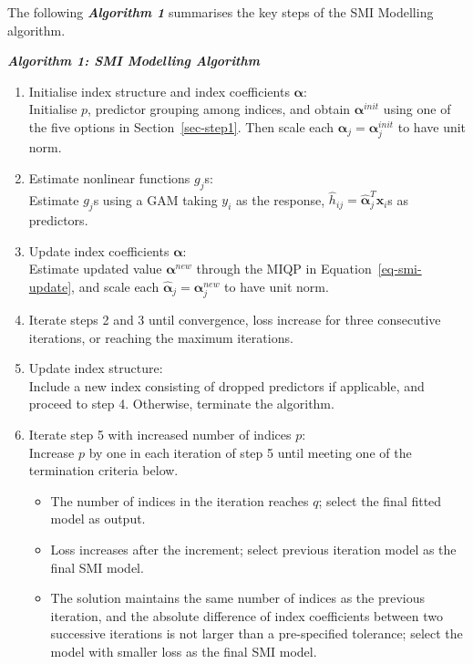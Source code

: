 \documentclass[11pt,a4paper,]{article}
\providecommand{\tightlist}{%
  \setlength{\itemsep}{0pt}\setlength{\parskip}{0pt}}
\begin{document}
The following \textbf{\emph{Algorithm 1}} summarises the key steps of
the SMI Modelling algorithm. \newline

\textbf{\emph{Algorithm 1: SMI Modelling Algorithm}}

\begin{enumerate}
\def\labelenumi{\arabic{enumi}.}
\item
  Initialise index structure and index coefficients \(\bm{\alpha}\):\\
  Initialise \(p\), predictor grouping among indices, and obtain
  \(\bm{\alpha}^{init}\) using one of the five options in
  Section~\ref{sec-step1}. Then scale each
  \(\hat{\bm{\alpha}}_{j} = \bm{\alpha}_{j}^{init}\) to have unit norm.
\item
  Estimate nonlinear functions \(g_{j}\)s:\\
  Estimate \(g_{j}\)s using a GAM taking \(y_{i}\) as the response,
  \(\hat{h}_{ij} = \hat{\bm{\alpha}}_{j}^{T}\bm{x}_{i}\)s as predictors.
\item
  Update index coefficients \(\bm{\alpha}\):\\
  Estimate updated value \(\bm{\alpha}^{new}\) through the MIQP in
  Equation~\ref{eq-smi-update}, and scale each
  \(\hat{\bm{\alpha}}_{j} = \bm{\alpha}_{j}^{new}\) to have unit norm.
\item
  Iterate steps 2 and 3 until convergence, loss increase for three
  consecutive iterations, or reaching the maximum iterations.
\item
  Update index structure:\\
  Include a new index consisting of dropped predictors if applicable,
  and proceed to step 4. Otherwise, terminate the algorithm.
\item
  Iterate step 5 with increased number of indices \(p\):\\
  Increase \(p\) by one in each iteration of step 5 until meeting one of
  the termination criteria below.

  \begin{itemize}
  \tightlist
  \item
    The number of indices in the iteration reaches \(q\); select the
    final fitted model as output.
  \item
    Loss increases after the increment; select previous iteration model
    as the final SMI model.
  \item
    The solution maintains the same number of indices as the previous
    iteration, and the absolute difference of index coefficients between
    two successive iterations is not larger than a pre-specified
    tolerance; select the model with smaller loss as the final SMI
    model.
  \end{itemize}
\end{enumerate}
\end{document}
